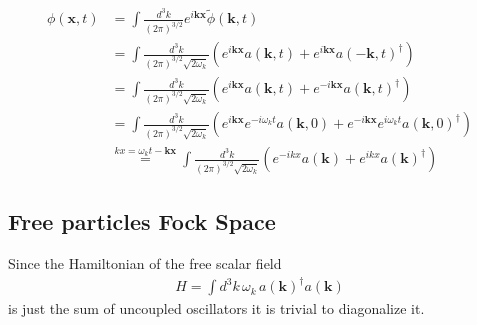 \documentclass{article}
\begin{document}
\begin{align}
\phi(\mathbf{x},t)
&=\int\frac{d^3k}{(2\pi)^{3/2}}e^{i\mathbf{kx}}\tilde\phi(\mathbf{k},t)\\
&=\int\frac{d^3k}{(2\pi)^{3/2}\sqrt{2\omega_k}}\left(e^{i\mathbf{kx}}a(\mathbf{k},t)+e^{i\mathbf{kx}}a(\mathbf{-k},t)^\dagger\right)\\
&=\int\frac{d^3k}{(2\pi)^{3/2}\sqrt{2\omega_k}}\left(e^{i\mathbf{kx}}a(\mathbf{k},t)+e^{-i\mathbf{kx}}a(\mathbf{k},t)^\dagger\right)\\
&=\int\frac{d^3k}{(2\pi)^{3/2}\sqrt{2\omega_k}}\left(e^{i\mathbf{kx}}e^{-i\omega_kt}a(\mathbf{k},0)+e^{-i\mathbf{kx}}e^{i\omega_kt}a(\mathbf{k},0)^\dagger\right)\\
&\overset{kx=\omega_kt-\mathbf{kx}}{=}\int\frac{d^3k}{(2\pi)^{3/2}\sqrt{2\omega_k}}\left(e^{-ikx}a(\mathbf{k})+e^{ikx}a(\mathbf{k})^\dagger\right)
\end{align}

\subsection{Free particles Fock Space}
Since the Hamiltonian of the free scalar field
\begin{align}
H=\int d^3k\,\omega_k\, a(\mathbf{k})^\dagger a(\mathbf{k})
\end{align}
is just the sum of uncoupled oscillators it is trivial to diagonalize it.
\end{document}
